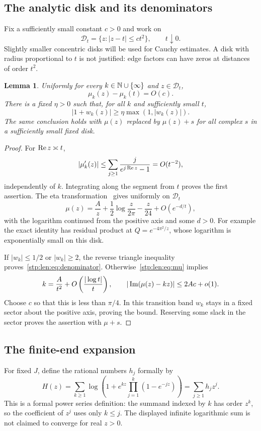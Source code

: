 \documentclass[11pt]{article}
\newtheorem{lemma}[theorem]{Lemma}
\theoremstyle{remark}\newtheorem{remark}[theorem]{Remark}
\begin{document}
\subsection{The analytic disk and its denominators}
Fix a sufficiently small constant $c>0$ and work on
\begin{equation}\label{stp:len:eq:disk}
 \mathcal D_t=\{z:|z-t|\le ct^2\},\qquad t\downarrow0.
\end{equation}
Slightly smaller concentric disks will be used for Cauchy estimates. A disk with radius proportional to $t$ is not justified: edge factors can have zeros at distances of order $t^2$.

\begin{lemma}\label{stp:len:lem:denominator}
Uniformly for every $k\in\mathbb N\cup\{\infty\}$ and $z\in\mathcal D_t$,
\[
 \mu_k(z)-\mu_k(t)=O(c).
\]
There is a fixed $\eta>0$ such that, for all $k$ and sufficiently small $t$,
\begin{equation}\label{stp:len:eq:denominator}
 |1+w_k(z)|\ge\eta\max(1,|w_k(z)|).
\end{equation}
The same conclusion holds with $\mu(z)$ replaced by $\mu(z)+s$ for all complex $s$ in a sufficiently small fixed disk.
\end{lemma}
\begin{proof}
For $\operatorname{Re} z\asymp t$,
\[
 |\mu_k'(z)|\le\sum_{j\ge1}\frac{j}{e^{j\operatorname{Re} z}-1}=O(t^{-2}),
\]
independently of $k$. Integrating along the segment from $t$ proves the first assertion. The eta transformation~\cite{dlmfeta} gives uniformly on $\mathcal D_t$
\begin{equation}\label{stp:len:eq:mu}
 \mu(z)=\frac A z+\frac12\log\frac{z}{2\pi}-\frac z{24}
        +O(e^{-d/t}),
\end{equation}
with the logarithm continued from the positive axis and some $d>0$. For example the exact identity has residual product at $Q=e^{-4\pi^2/z}$, whose logarithm is exponentially small on this disk.

If $|w_k|\le1/2$ or $|w_k|\ge2$, the reverse triangle inequality proves~\eqref{stp:len:eq:denominator}. Otherwise~\eqref{stp:len:eq:mu} implies
\[
 k=\frac A{t^2}+O\left(\frac{|\log t|}{t}\right),\qquad
 |\operatorname{Im}(\mu(z)-kz)|\le2Ac+o(1).
\]
Choose $c$ so that this is less than $\pi/4$. In this transition band $w_k$ stays in a fixed sector about the positive axis, proving the bound. Reserving some slack in the sector proves the assertion with $\mu+s$.
\end{proof}

\subsection{The finite-end expansion}
For fixed $J$, define the rational numbers $h_j$ formally by
\begin{equation}\label{stp:len:eq:Hformal}
 H(z)=\sum_{k\ge1}\log\left(1+e^{kz}\prod_{j=1}^k(1-e^{-jz})\right)
     =\sum_{j\ge1}h_jz^j.
\end{equation}
This is a formal power series definition: the summand indexed by $k$ has order $z^k$, so the coefficient of $z^j$ uses only $k\le j$. The displayed infinite logarithmic sum is not claimed to converge for real $z>0$.
\end{document}
